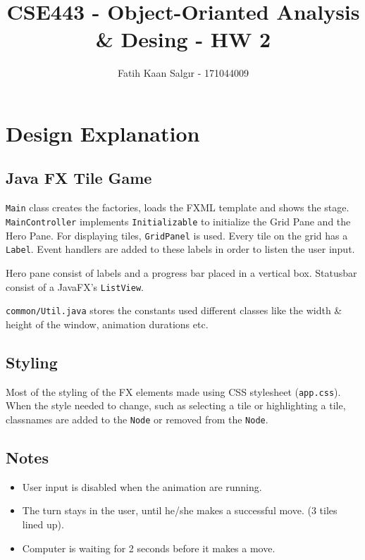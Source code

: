 \documentclass[a4paper]{article}
\author{Fatih Kaan Salgır - 171044009}
\date{}
\title{CSE443 - Object-Orianted Analysis \& Desing - HW 2}
\begin{document}
\maketitle

\section*{Design Explanation}
\label{sec:org9c0643d}

\subsection*{Java FX Tile Game}
\label{sec:orgd847ebb}

\texttt{Main} class creates the factories, loads the FXML template and shows the stage.
\texttt{MainController} implements \texttt{Initializable} to initialize the Grid Pane and the Hero Pane.
For displaying tiles, \texttt{GridPanel} is used.
Every tile on the grid has a \texttt{Label}.
Event handlers are added to these labels in order to listen the user input.

Hero pane consist of labels and a progress bar placed in a vertical box.
Statusbar consist of a JavaFX's \texttt{ListView}.

\texttt{common/Util.java} stores the constants used different classes like the width \& height of the window, animation durations etc.

\subsection*{Styling}
\label{sec:org5183f97}

Most of the styling of the FX elements made using CSS stylesheet (\texttt{app.css}).
When the style needed to change, such as selecting a tile or highlighting a tile, classnames are added to the \texttt{Node} or removed from the \texttt{Node}.

\subsection*{Notes}
\label{sec:org4f6f05b}

\begin{itemize}
\item User input is disabled when the animation are running.
\item The turn stays in the user, until he/she makes a successful move. (3 tiles lined up).
\item Computer is waiting for 2 seconds before it makes a move.
\end{itemize}
\end{document}
